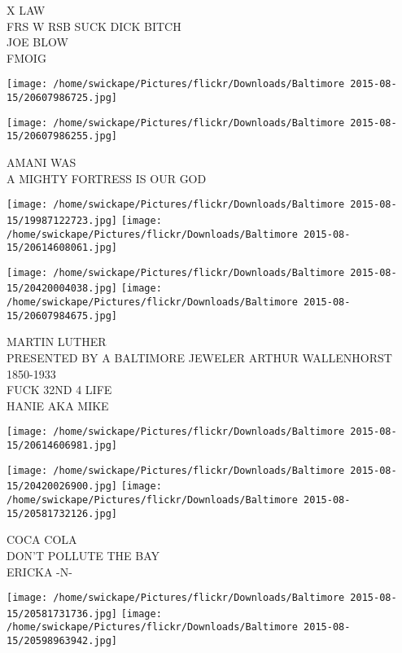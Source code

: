 \documentclass[10pt,letterpaper]{article}
\begin{document}
X LAW\\
FRS W RSB SUCK DICK BITCH\\
JOE BLOW\\
FMOIG\\
\pagebreak

\texttt{[image: /home/swickape/Pictures/flickr/Downloads/Baltimore 2015-08-15/20607986725.jpg]}

\vspace{0.25in}
\texttt{[image: /home/swickape/Pictures/flickr/Downloads/Baltimore 2015-08-15/20607986255.jpg]}

AMANI WAS\\
A MIGHTY FORTRESS IS OUR GOD\\
\pagebreak

\texttt{[image: /home/swickape/Pictures/flickr/Downloads/Baltimore 2015-08-15/19987122723.jpg]}
\texttt{[image: /home/swickape/Pictures/flickr/Downloads/Baltimore 2015-08-15/20614608061.jpg]}

\texttt{[image: /home/swickape/Pictures/flickr/Downloads/Baltimore 2015-08-15/20420004038.jpg]}
\texttt{[image: /home/swickape/Pictures/flickr/Downloads/Baltimore 2015-08-15/20607984675.jpg]}

MARTIN LUTHER\\
PRESENTED BY A BALTIMORE JEWELER ARTHUR WALLENHORST 1850{-}1933\\
FUCK 32ND 4 LIFE\\
HANIE AKA MIKE\\
\pagebreak

\texttt{[image: /home/swickape/Pictures/flickr/Downloads/Baltimore 2015-08-15/20614606981.jpg]}

\vspace{0.25in}
\texttt{[image: /home/swickape/Pictures/flickr/Downloads/Baltimore 2015-08-15/20420026900.jpg]}
\texttt{[image: /home/swickape/Pictures/flickr/Downloads/Baltimore 2015-08-15/20581732126.jpg]}

COCA COLA\\
DON'T POLLUTE THE BAY\\
ERICKA {-}N{-}\\
\pagebreak

\texttt{[image: /home/swickape/Pictures/flickr/Downloads/Baltimore 2015-08-15/20581731736.jpg]}
\texttt{[image: /home/swickape/Pictures/flickr/Downloads/Baltimore 2015-08-15/20598963942.jpg]}
\end{document}
